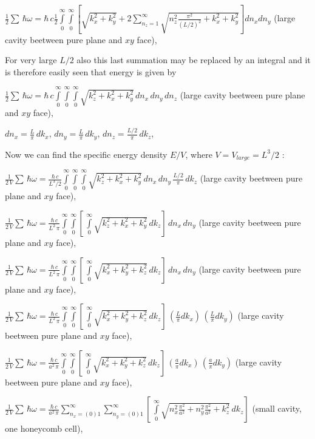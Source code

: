 \documentclass[11pt]{article}
\begin{document}
    \(\frac{1}{2}\sum\,\hbar\omega = \hbar\,c\frac{1}{2}\int\limits_{0}^{\infty}\int\limits_{0}^{\infty}\left[{\sqrt{k_x^2+k_y^2}+2\sum\limits_{n_z=1}^{\infty}\sqrt{n_z^2\frac{\pi^2}{(L/2)^2}+k_x^2+k_y^2}}\right]d{n_x}d{n_y}\)
(large cavity beetween pure plane and \(xy\) face),

    For very large \(L/2\) also this last summation may be replaced by an
integral and it is therefore easily seen that energy is given by

    \(\frac{1}{2}\sum\,\hbar\omega = \hbar\,c\int\limits_{0}^{\infty}\int\limits_{0}^{\infty}\int\limits_{0}^{\infty}\sqrt{k_z^2+k_x^2+k_y^2}\,d{n_x}\,d{n_y}\,d{n_z}\)
(large cavity beetween pure plane and \(xy\) face),

    \(dn_x = \frac{L}{\pi}\,dk_x\), \(dn_y = \frac{L}{\pi}\,dk_y\),
\(dn_z = \frac{L/2}{\pi}\,dk_z\),

    Now we can find the specific energy density \(E/V\), where
\(V = V_{large} = L^3/2\) :

    \(\frac{1}{2\,V}\sum\,\hbar\omega = \frac{\hbar\,c}{L^3/2}\int\limits_{0}^{\infty}\int\limits_{0}^{\infty}\int\limits_{0}^{\infty}\sqrt{k_z^2+k_x^2+k_y^2}\,dn_x\,dn_y\,\frac{L/2}{\pi}\,dk_z\)
(large cavity beetween pure plane and \(xy\) face),

    \(\frac{1}{2\,V}\sum\,\hbar\omega = \frac{\hbar\,c}{L^2\,\pi}\int\limits_{0}^{\infty}\int\limits_{0}^{\infty}\left[\,\int\limits_{0}^{\infty}\sqrt{k_z^2+k_x^2+k_y^2}\,dk_z\right]\,dn_x\,dn_y\)
(large cavity beetween pure plane and \(xy\) face),

    \(\frac{1}{2\,V}\sum\,\hbar\omega = \frac{\hbar\,c}{L^2\,\pi}\int\limits_{0}^{\infty}\int\limits_{0}^{\infty}\left[\,\int\limits_{0}^{\infty}\sqrt{k_x^2+k_y^2+k_z^2}\,dk_z\right]\,dn_x\,dn_y\)
(large cavity beetween pure plane and \(xy\) face),

    \(\frac{1}{2\,V}\sum\,\hbar\omega = \frac{\hbar\,c}{L^2\,\pi}\int\limits_{0}^{\infty}\int\limits_{0}^{\infty}\left[\,\int\limits_{0}^{\infty}\sqrt{k_x^2+k_y^2+k_z^2}\,dk_z\right]\,\left(\frac{L}{\pi}dk_x\right)\,\left(\frac{L}{\pi}dk_y\right)\)
(large cavity beetween pure plane and \(xy\) face),

    \(\frac{1}{2\,V}\sum\,\hbar\omega = \frac{\hbar\,c}{a^2\,\pi}\int\limits_{0}^{\infty}\int\limits_{0}^{\infty}\left[\,\int\limits_{0}^{\infty}\sqrt{k_x^2+k_y^2+k_z^2}\,dk_z\right]\,\left(\frac{a}{\pi}dk_x\right)\,\left(\frac{a}{\pi}dk_y\right)\)
(large cavity beetween pure plane and \(xy\) face),

    \(\frac{1}{2\,V}\sum\,\hbar\omega = \frac{\hbar\,c}{a^2\,\pi}\sum\limits_{n_x=(0)1}^{\infty}\sum\limits_{n_y=(0)1}^{\infty}\left[\,\int\limits_{0}^{\infty}\sqrt{n_x^2\frac{\pi^2}{a^2}+n_y^2\frac{\pi^2}{a^2}+k_z^2}\,dk_z\right]\)
(small cavity, one honeycomb cell),
\end{document}
